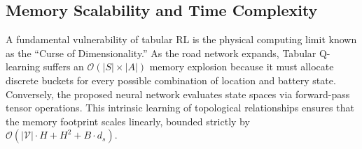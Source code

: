 \documentclass[journal, a4paper, twocolumn]{IEEEtran}
\begin{document}
\begin{table}[htbp]
\centering
\caption{Full System Parameter Reference}
\label{tab:full_params}
\end{table}

\subsection{Memory Scalability and Time Complexity}
A fundamental vulnerability of tabular RL is the physical computing limit known as the ``Curse of Dimensionality.'' As the road network expands, Tabular Q-learning suffers an $\mathcal{O}(|S| \times |A|)$ memory explosion because it must allocate discrete buckets for every possible combination of location and battery state. Conversely, the proposed neural network evaluates state spaces via forward-pass tensor operations. This intrinsic learning of topological relationships ensures that the memory footprint scales linearly, bounded strictly by $\mathcal{O}(|\mathcal{V}|\cdot H+H^{2}+B\cdot d_{s})$.
\end{document}
